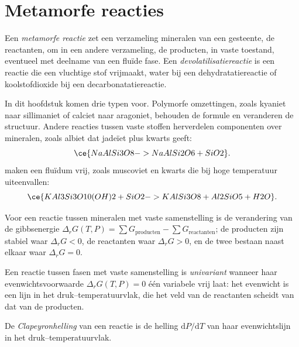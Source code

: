 \section{Metamorfe reacties}\label{sec:b2:metamorphic-facies:reactions}

\begin{definition}\label{def:b2:metamorphic-facies:reaction}
Een \emph{metamorfe reactie} zet een verzameling mineralen
van een gesteente, de reactanten, om in een andere verzameling, de producten, in vaste toestand, eventueel
met deelname van een fluïde fase. Een \emph{devolatilisatiereactie}
is een reactie die een vluchtige stof vrijmaakt, water bij een dehydratatiereactie of
koolstofdioxide bij een decarbonatatiereactie.
\end{definition}

In dit hoofdstuk komen drie typen voor. Polymorfe omzettingen, zoals kyaniet naar
sillimaniet of calciet naar aragoniet, behouden de formule en veranderen de structuur.
Andere reacties tussen vaste stoffen herverdelen componenten over mineralen, zoals
albiet dat jadeïet plus kwarts geeft:
\[
\ce{NaAlSi3O8 -> NaAlSi2O6 + SiO2}.
\]
 maken een fluïdum vrij, zoals muscoviet en kwarts die bij hoge
temperatuur uiteenvallen:
\[
\ce{KAl3Si3O10(OH)2 + SiO2 -> KAlSi3O8 + Al2SiO5 + H2O}.
\]

Voor een reactie tussen mineralen met vaste samenstelling is de verandering van de gibbsenergie
$\Delta_r G(T, P) = \sum G_{\text{producten}} - \sum G_{\text{reactanten}}$; de producten
zijn stabiel waar $\Delta_r G < 0$, de reactanten waar $\Delta_r G > 0$, en de twee
bestaan naast elkaar waar $\Delta_r G = 0$.

\begin{definition}\label{def:b2:metamorphic-facies:univariant}
Een reactie tussen fasen met vaste samenstelling is \emph{univariant}
wanneer haar evenwichtsvoorwaarde $\Delta_r G(T, P) = 0$ één variabele
vrij laat: het evenwicht is een lijn in het druk--temperatuurvlak, die
het veld van de reactanten scheidt van dat van de producten.
\end{definition}

\begin{definition}[Clapeyronhelling]\label{def:b2:metamorphic-facies:clapeyron}
De \emph{Clapeyronhelling} van een reactie is de helling
$\mathrm dP/\mathrm dT$ van haar evenwichtslijn in het druk--temperatuurvlak.
\end{definition}

